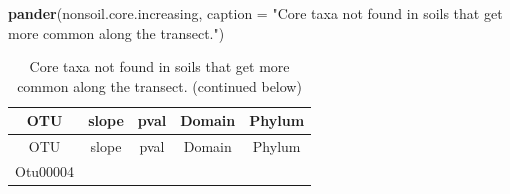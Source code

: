 \documentclass[]{article}
\newenvironment{Shaded}{\begin{snugshade}}{\end{snugshade}}
\newcommand{\KeywordTok}[1]{\textcolor[rgb]{0.13,0.29,0.53}{\textbf{#1}}}
\newcommand{\DataTypeTok}[1]{\textcolor[rgb]{0.13,0.29,0.53}{#1}}
\newcommand{\StringTok}[1]{\textcolor[rgb]{0.31,0.60,0.02}{#1}}
\newcommand{\NormalTok}[1]{#1}
\begin{document}
\begin{Shaded}
\begin{Highlighting}[]
\KeywordTok{pander}\NormalTok{(nonsoil.core.increasing, }\DataTypeTok{caption =} \StringTok{"Core taxa not found in soils that get more common along the transect."}\NormalTok{)}
\end{Highlighting}
\end{Shaded}

\begin{longtable}[]{@{}ccccc@{}}
\caption{Core taxa not found in soils that get more common along the
transect. (continued below)}\tabularnewline
\toprule
\begin{minipage}[b]{0.13\columnwidth}\centering\strut
OTU\strut
\end{minipage} & \begin{minipage}[b]{0.16\columnwidth}\centering\strut
slope\strut
\end{minipage} & \begin{minipage}[b]{0.14\columnwidth}\centering\strut
pval\strut
\end{minipage} & \begin{minipage}[b]{0.13\columnwidth}\centering\strut
Domain\strut
\end{minipage} & \begin{minipage}[b]{0.27\columnwidth}\centering\strut
Phylum\strut
\end{minipage}\tabularnewline
\midrule
\endfirsthead
\toprule
\begin{minipage}[b]{0.13\columnwidth}\centering\strut
OTU\strut
\end{minipage} & \begin{minipage}[b]{0.16\columnwidth}\centering\strut
slope\strut
\end{minipage} & \begin{minipage}[b]{0.14\columnwidth}\centering\strut
pval\strut
\end{minipage} & \begin{minipage}[b]{0.13\columnwidth}\centering\strut
Domain\strut
\end{minipage} & \begin{minipage}[b]{0.27\columnwidth}\centering\strut
Phylum\strut
\end{minipage}\tabularnewline
\midrule
\endhead
\begin{minipage}[t]{0.13\columnwidth}\centering\strut
Otu00004\strut
\end{minipage} & \begin{minipage}[t]{0.16\columnwidth}\centering\strut

\end{minipage}
\end{longtable}
\end{document}
